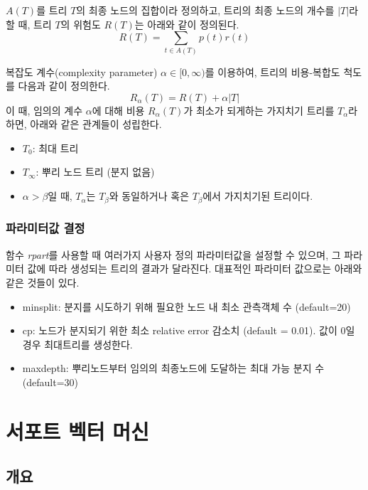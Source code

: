 \documentclass[]{book}
\providecommand{\tightlist}{%
  \setlength{\itemsep}{0pt}\setlength{\parskip}{0pt}}
\begin{document}
\(A(T)\)를 트리 \(T\)의 최종 노드의 집합이라 정의하고, 트리의 최종 노드의 개수를 \(|T|\)라 할 때, 트리 \(T\)의 위험도 \(R(T)\)는 아래와 같이 정의된다.
\[R(T) = \sum_{t \in A(T)} p(t)r(t)\]

복잡도 계수(complexity parameter) \(\alpha \in [0, \infty)\)를 이용하여, 트리의 비용-복합도 척도를 다음과 같이 정의한다.
\[R_\alpha(T) = R(T) + \alpha|T|\]
이 때, 임의의 계수 \(\alpha\)에 대해 비용 \(R_\alpha(T)\)가 최소가 되게하는 가지치기 트리를 \(T_\alpha\)라 하면, 아래와 같은 관계들이 성립한다.

\begin{itemize}
\tightlist
\item
  \(T_0\): 최대 트리
\item
  \(T_\infty\): 뿌리 노드 트리 (분지 없음)
\item
  \(\alpha > \beta\)일 때, \(T_\alpha\)는 \(T_\beta\)와 동일하거나 혹은 \(T_\beta\)에서 가지치기된 트리이다.
\end{itemize}

\hypertarget{cart-r-pkg-param}{%
\subsection{파라미터값 결정}\label{cart-r-pkg-param}}

함수 \emph{rpart}를 사용할 때 여러가지 사용자 정의 파라미터값을 설정할 수 있으며, 그 파라미터 값에 따라 생성되는 트리의 결과가 달라진다. 대표적인 파라미터 값으로는 아래와 같은 것들이 있다.

\begin{itemize}
\tightlist
\item
  minsplit: 분지를 시도하기 위해 필요한 노드 내 최소 관측객체 수 (default=20)
\item
  cp: 노드가 분지되기 위한 최소 relative error 감소치 (default = 0.01). 값이 0일 경우 최대트리를 생성한다.
\item
  maxdepth: 뿌리노드부터 임의의 최종노드에 도달하는 최대 가능 분지 수 (default=30)
\end{itemize}

\hypertarget{svm}{%
\chapter{서포트 벡터 머신}\label{svm}}

\hypertarget{svm-overview}{%
\section{개요}\label{svm-overview}}
\end{document}
